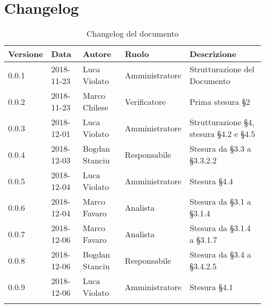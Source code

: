 \section{Changelog}

\begin{center}
\begin{longtable}[c]{|m{}|m{}|m{}|m{}|p{}|}
\hline
\textbf{Versione} & \textbf{Data} & \textbf{Autore} & \textbf{Ruolo} & \textbf{Descrizione} \\
\hline \hline
\endfirsthead
0.0.1 & 2018-11-23 & Luca Violato & Amministratore & Strutturazione del Documento \\
\hline
0.0.2 & 2018-11-23 & Marco Chilese & Verificatore & Prima stesura §2\\
\hline
0.0.3 & 2018-12-01 & Luca Violato & Amministratore & Strutturazione §4, stesura §4.2 e §4.5 \\
\hline
0.0.4 & 2018-12-03 & Bogdan Stanciu & Responsabile & Stesura da §3.3 a §3.3.2.2 \\
\hline
0.0.5 & 2018-12-04 & Luca Violato & Amministratore & Stesura §4.4 \\
\hline
0.0.6 & 2018-12-04 & Marco Favaro & Analista & Stesura da §3.1 a §3.1.4 \\
\hline
0.0.7 & 2018-12-06 & Marco Favaro & Analista & Stesura da §3.1.4 a §3.1.7 \\
\hline
0.0.8 & 2018-12-06 & Bogdan Stanciu & Responsabile & Stesura da §3.4 a §3.4.2.5 \\
\hline
0.0.9 & 2018-12-06 & Luca Violato & Amministratore & Stesura §4.1\\
\hline
\caption{Changelog del documento}
\end{longtable}
\end{center}